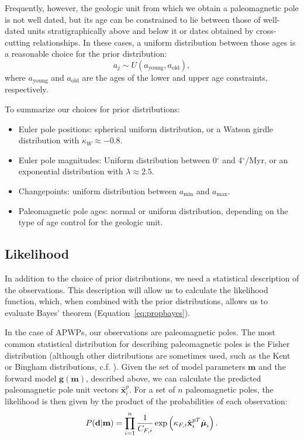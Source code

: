 \documentclass[11pt,letterpaper]{article}
\newcommand{\mitbf}[1]{\hbox{\mathversion{bold}$#1$}}
\begin{document}
Frequently, however, the geologic unit from which we obtain a paleomagnetic pole is not well dated, but its age can be constrained to lie between those of well-dated units stratigraphically above and below it or dates obtained by cross-cutting relationships. In these cases, a uniform distribution between those ages is a reasonable choice
for the prior distribution:
\begin{equation}
a_j \sim U(a_\mathrm{young}, a_\mathrm{old}),
\end{equation}
where $a_\mathrm{young}$ and $a_\mathrm{old}$ are the ages of the lower and upper age constraints, respectively.

To summarize our choices for prior distributions:
\begin{itemize}
\item Euler pole positions: spherical uniform distribution, or a Watson girdle distribution with $\kappa_W \approx -0.8$.
\item Euler pole magnitudes: Uniform distribution between 0$^\circ$ and 4$^\circ$/Myr, or an exponential distribution with $\lambda \approx 2.5$.
\item Changepoints: uniform distribution between $a_\mathrm{min}$ and $a_\mathrm{max}$.
\item Paleomagnetic pole ages: normal or uniform distribution, depending on the type of age control for the geologic unit.
\end{itemize}

\subsection*{Likelihood}
\label{sec:likelihood}
In addition to the choice of prior distributions, we need a statistical description of the observations. This description will allow us to calculate the likelihood function, which, when combined with the prior distributions, allows us to evaluate Bayes' theorem (Equation~\eqref{eq:propbayes}).

In the case of APWPs, our observations are paleomagnetic poles. The most common statistical distribution for describing paleomagnetic poles is the Fisher distribution (although other distributions are sometimes used, such as the Kent or Bingham distributions, c.f. \citet{Tauxe2010a}). Given the set of model parameters $\mathbf{m}$ and the forward model $\mathbf{g}(\mathbf{m})$, described above, we can calculate the predicted paleomagnetic pole unit vectors $\hat{\mathbf{x}}_i^p$. For a set of $n$ paleomagnetic poles, the likelihood is then given by the product of the probabilities of each observation:
\begin{equation}
P(\mathbf{d} \vert \mathbf{m}) = \displaystyle\prod_{i=1}^n \frac{1}{C_{F,i}} \exp \left( \kappa_{F,i} \hat{\mathbf{x}}_{i}^{pT} \hat{\mitbf{\mu}}_i \right).
\label{eq:model_likelihood}
\end{equation}
\end{document}

